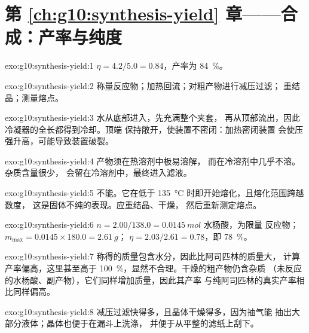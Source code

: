 \section*{第 \ref{ch:g10:synthesis-yield} 章——合成：产率与纯度}

\begin{solution}{exo:g10:synthesis-yield:1}
$\eta = 4.2 / 5.0 = 0.84$，产率为 \qty{84}{\percent}。
\end{solution}

\begin{solution}{exo:g10:synthesis-yield:2}
称量反应物；加热回流；对粗产物进行减压过滤；
重结晶；测量熔点。
\end{solution}

\begin{solution}{exo:g10:synthesis-yield:3}
水从底部进入，先充满整个夹套，
再从顶部流出，因此冷凝器的全长都得到冷却。顶端
保持敞开，使装置不密闭：加热密闭装置
会使压强升高，可能导致装置破裂。
\end{solution}

\begin{solution}{exo:g10:synthesis-yield:4}
产物须在热溶剂中极易溶解，
而在冷溶剂中几乎不溶。杂质含量很少，
会留在冷溶剂中，最终进入滤液。
\end{solution}

\begin{solution}{exo:g10:synthesis-yield:5}
不能。它在低于 \qty{135}{\celsius} 时即开始熔化，且熔化范围跨越数度，
这是固体不纯的表现。应重结晶、干燥，
然后重新测定熔点。
\end{solution}

\begin{solution}{exo:g10:synthesis-yield:6}
$n = 2.00 / 138.0 = \qty{0.0145}{mol}$ 水杨酸，为限量
反应物；$m_{\max} = 0.0145 \times 180.0 = \qty{2.61}{g}$；
$\eta = 2.03 / 2.61 = 0.78$，即 \qty{78}{\percent}。
\end{solution}

\begin{solution}{exo:g10:synthesis-yield:7}
称得的质量包含水分，因此比阿司匹林的质量大，
计算产率偏高，这里甚至高于
\qty{100}{\percent}，显然不合理。干燥的粗产物仍含杂质
（未反应的水杨酸、副产物），它们同样增加质量，因此其产率
与纯阿司匹林的真实产率相比同样偏高。
\end{solution}

\begin{solution}{exo:g10:synthesis-yield:8}
减压过滤快得多，且晶体干燥得多，因为抽气能
抽出大部分液体；晶体也便于在漏斗上洗涤，
并便于从平整的滤纸上刮下。
\end{solution}

